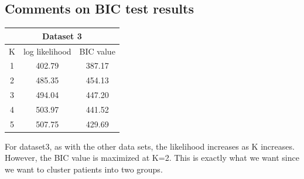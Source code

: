 \documentclass[11pt,psfig]{article}
\begin{document}
\subsection{Comments on BIC test results}

\begin{table}[H]
  \centering
  \begin{tabular}{|c|c|c|}
    \hline
    \multicolumn{3}{|c|}{Dataset 3} \\\hline
    K & log likelihood & BIC value \\\hline
    1 & 402.79 & 387.17 \\
		2 & 485.35 & 454.13 \\
		3 & 494.04 & 447.20 \\
		4 & 503.97 & 441.52 \\
    5 & 507.75 & 429.69 \\\hline
  \end{tabular}
\end{table}

For dataset3, as with the other data sets, the likelihood increases as K increases. However, the BIC value is maximized at K=2. This is exactly what we want since we want to cluster patients into two groups. 
\end{document}

